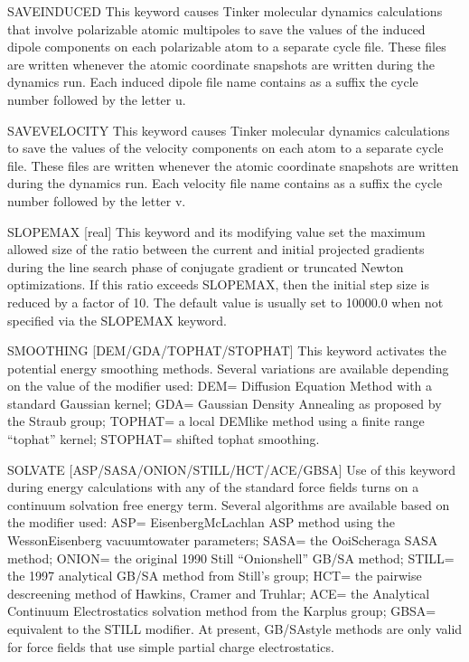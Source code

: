 \documentclass[letterpaper,11pt,english]{sphinxmanual}
\begin{document}
SAVE\sphinxhyphen{}INDUCED     This keyword causes Tinker molecular dynamics calculations that involve polarizable atomic multipoles to save the values of the induced dipole components on each polarizable atom to a separate cycle file. These files are written whenever the atomic coordinate snapshots are written during the dynamics run. Each induced dipole file name contains as a suffix the cycle number followed by the letter u.

SAVE\sphinxhyphen{}VELOCITY     This keyword causes Tinker molecular dynamics calculations to save the values of the velocity components on each atom to a separate cycle file. These files are written whenever the atomic coordinate snapshots are written during the dynamics run. Each velocity file name contains as a suffix the cycle number followed by the letter v.

SLOPEMAX {[}real{]}     This keyword and its modifying value set the maximum allowed size of the ratio between the current and initial projected gradients during the line search phase of conjugate gradient or truncated Newton optimizations. If this ratio exceeds SLOPEMAX, then the initial step size is reduced by a factor of 10. The default value is usually set to 10000.0 when not specified via the SLOPEMAX keyword.

SMOOTHING {[}DEM/GDA/TOPHAT/STOPHAT{]}     This keyword activates the potential energy smoothing methods. Several variations are available depending on the value of the modifier used: DEM= Diffusion Equation Method with a standard Gaussian kernel; GDA= Gaussian Density Annealing as proposed by the Straub group; TOPHAT= a local DEM\sphinxhyphen{}like method using a finite range “tophat” kernel; STOPHAT= shifted tophat smoothing.

SOLVATE {[}ASP/SASA/ONION/STILL/HCT/ACE/GBSA{]}     Use of this keyword during energy calculations with any of the standard force fields turns on a continuum solvation free energy term. Several algorithms are available based on the modifier used: ASP= Eisenberg\sphinxhyphen{}McLachlan ASP method using the Wesson\sphinxhyphen{}Eisenberg vacuum\sphinxhyphen{}to\sphinxhyphen{}water parameters; SASA= the Ooi\sphinxhyphen{}Scheraga SASA method; ONION= the original 1990 Still “Onion\sphinxhyphen{}shell” GB/SA method; STILL= the 1997 analytical GB/SA method from Still’s group; HCT= the pairwise descreening method of Hawkins, Cramer and Truhlar; ACE= the Analytical Continuum Electrostatics solvation method from the Karplus group; GBSA= equivalent to the STILL modifier. At present, GB/SA\sphinxhyphen{}style methods are only valid for force fields that use simple partial charge electrostatics.
\end{document}
